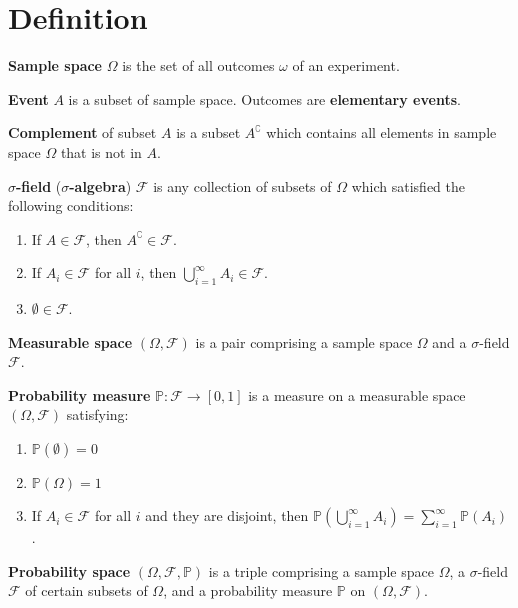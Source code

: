 \documentclass{huhtakm-template-book}
\newcommand{\prob}{\mathbb{P}}
\begin{document}
\section*{Definition}
    \begin{sdefn}
        \textbf{Sample space} $\Omega$ is the set of all outcomes $\omega$ of an experiment.
    \end{sdefn}
    \begin{sdefn}
        \textbf{Event} $A$ is a subset of sample space. Outcomes are \textbf{elementary events}.
    \end{sdefn}
    \begin{sdefn}
        \textbf{Complement} of subset $A$ is a subset $A^{\complement}$ which contains all elements in sample space $\Omega$ that is not in $A$.
    \end{sdefn}
    \begin{sdefn}
        \textbf{$\sigma$-field} (\textbf{$\sigma$-algebra}) $\mathcal{F}$ is any collection of subsets of $\Omega$ which satisfied the following conditions:
        \begin{enumerate}
            \item If $A\in\mathcal{F}$, then $A^{\complement}\in\mathcal{F}$.
            \item If $A_{i}\in\mathcal{F}$ for all $i$, then $\bigcup_{i=1}^{\infty}A_{i}\in\mathcal{F}$.
            \item $\emptyset\in\mathcal{F}$.
        \end{enumerate}
    \end{sdefn}
    \begin{sdefn}
        \textbf{Measurable space} $(\Omega,\mathcal{F})$ is a pair comprising a sample space $\Omega$ and a $\sigma$-field $\mathcal{F}$.
    \end{sdefn}
    \begin{sdefn}
        \textbf{Probability measure} $\prob:\mathcal{F}\to[0,1]$ is a measure on a measurable space $(\Omega,\mathcal{F})$ satisfying:
        \begin{enumerate}
            \item $\prob(\emptyset)=0$
            \item $\prob(\Omega)=1$
            \item If $A_{i}\in\mathcal{F}$ for all $i$ and they are disjoint, then $\prob(\bigcup_{i=1}^{\infty}A_{i})=\sum_{i=1}^{\infty}\prob(A_{i})$.
        \end{enumerate}
    \end{sdefn}
    \begin{sdefn}
        \textbf{Probability space} $(\Omega,\mathcal{F},\prob)$ is a triple comprising a sample space $\Omega$, a $\sigma$-field $\mathcal{F}$ of certain subsets of $\Omega$, and a probability measure $\prob$ on $(\Omega,\mathcal{F})$.
    \end{sdefn}
\end{document}
